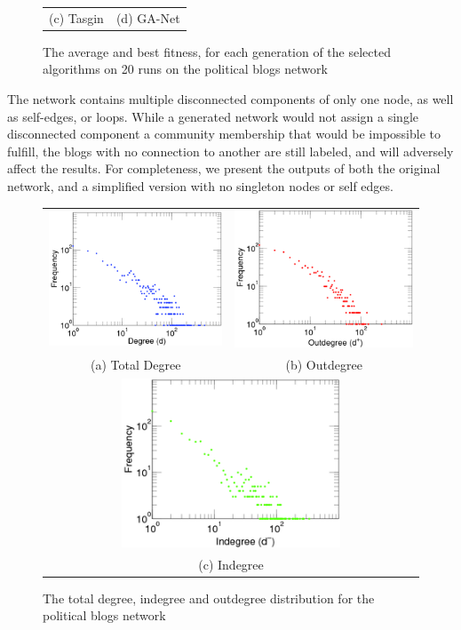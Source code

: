 \begin{figure}
\begin{tabular}{cc}
		(c) Tasgin & (d) GA-Net \\[6pt]
	\end{tabular}
	\caption{The average and best fitness, for each generation of the selected algorithms on 20  runs on the political blogs network}
\end{figure}


The network contains multiple disconnected components of only one node, as well as self-edges, or loops. While a generated network would not assign a single disconnected component a community membership that would be impossible to fulfill, the blogs with no connection to another are still labeled, and will adversely affect the results. For completeness, we present the outputs of both the original network, and a simplified version with no singleton nodes or self edges. 

\begin{figure}
	\begin{tabular}{cc}
		\includegraphics[width=65mm]{images/blogs_total.png} &   \includegraphics[width=65mm]{images/blogs_out.png} \\
		(a) Total Degree & (b) Outdegree \\[6pt]
		\multicolumn{2}{c}{\includegraphics[width=65mm]{images/blogs_in.png} }\\
		\multicolumn{2}{c}{(c) Indegree}
	\end{tabular}
	\caption{The total degree, indegree and outdegree distribution for the political blogs network\cite{Kunegis2013}}
\end{figure}